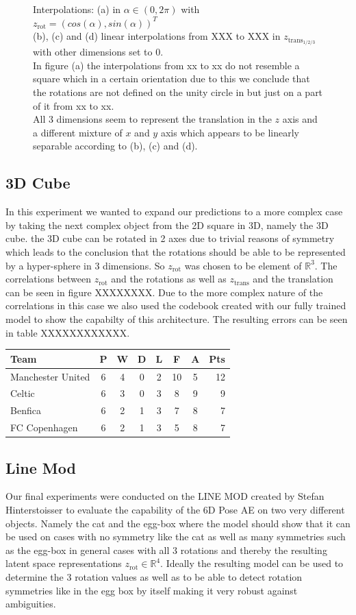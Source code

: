 \documentclass[10pt,a4paper]{article}
\newcommand{\rot}{\ensuremath{\text{rot}\xspace}}
\newcommand{\trans}{\ensuremath{\text{trans}\xspace}}
\begin{document}
\begin{figure}[!ht]
\begin{subfigure}{0.49\textwidth}
	\caption{}
	\label{fig1:subim4}
\end{subfigure}
\caption{Interpolations: (a) in $\alpha \in (0, 2 \pi)$ with $z_{\rot}= (cos(\alpha), sin(\alpha))^T$\\
(b), (c) and (d) linear interpolations from XXX to XXX in $z_{\trans_{1/2/3}}$ with other dimensions set to 0.\\
In figure (a) the interpolations from xx to xx do not resemble a square which in a certain orientation due to this we conclude that the rotations are not defined on the unity circle in but just on a part of it from xx to xx.\\
All 3 dimensions seem to represent the translation in the $z$ axis and a different mixture of $x$ and $y$ axis which appears to be linearly separable according to (b), (c) and (d).} \label{Square_ipol}
\end{figure}
\newpage
\subsection{3D Cube}\label{Cube}
In this experiment we wanted to expand our predictions to a more complex case by taking the next complex object from the 2D square in 3D, namely the 3D cube. the 3D cube can be rotated in 2 axes due to trivial reasons of symmetry which leads to the conclusion that the rotations should be able to be represented by a hyper-sphere in 3 dimensions. So $z_{\rot}$ was chosen to be element of $\mathbb{R}^3$. The correlations between $z_{\rot}$ and the rotations as well as $z_{\trans}$ and the translation can be seen in figure XXXXXXXX.
Due to the more complex nature of the correlations in this case we also used the codebook created with our fully trained model to show the capabilty of this architecture. The resulting errors can be seen in table XXXXXXXXXXXX.
\begin{tabular}{l*{6}{c}r}
Team              & P & W & D & L & F  & A & Pts \\
\hline
Manchester United & 6 & 4 & 0 & 2 & 10 & 5 & 12  \\
Celtic            & 6 & 3 & 0 & 3 &  8 & 9 &  9  \\
Benfica           & 6 & 2 & 1 & 3 &  7 & 8 &  7  \\
FC Copenhagen     & 6 & 2 & 1 & 3 &  5 & 8 &  7  \\
\end{tabular}
\newpage
\subsection{Line Mod}
Our final experiments were conducted on the LINE MOD created by Stefan Hinterstoisser \cite{LINEMOD} to evaluate the capability of the 6D Pose AE on two very different objects. Namely the cat and the egg-box where the model should show that it can be used on cases with no symmetry like the cat as well as many symmetries such as the egg-box in general cases with all 3 rotations and thereby the resulting latent space representations $z_{\rot} \in \mathbb{R}^4$. Ideally the resulting model can be used to determine the 3 rotation values as well as to be able to detect rotation symmetries like in the egg box by itself making it very robust against ambiguities. 
\end{document}
